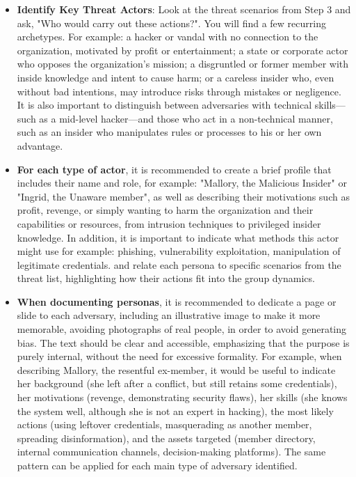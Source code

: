 \begin{itemize}
    \item \textbf{Identify Key Threat Actors}: Look at the threat scenarios from Step 3 and ask, "Who would
    carry out these actions?". You will find a few recurring archetypes. For example:
    a hacker or vandal with no connection to the organization, motivated by profit or
    entertainment; a state or corporate actor who opposes the organization's
    mission; a disgruntled or former member with inside knowledge and intent to
    cause harm; or a careless insider who, even without bad intentions, may
    introduce risks through mistakes or negligence. It is also important to
    distinguish between adversaries with technical skills—such as a mid-level
    hacker—and those who act in a non-technical manner, such as an insider who
    manipulates rules or processes to his or her own advantage.

    \item \textbf{For each type of actor}, it is recommended to create a brief profile that
    includes their name and role, for example: "Mallory, the Malicious Insider" or "Ingrid,
    the Unaware member", as well as describing their motivations such as profit,
    revenge, or simply wanting to harm the organization and their capabilities or
    resources, from intrusion techniques to privileged insider knowledge. In
    addition, it is important to indicate what methods this actor might use for example:
    phishing, vulnerability exploitation, manipulation of legitimate credentials.
    and relate each persona to specific scenarios from the threat list, highlighting
    how their actions fit into the group dynamics.

    \item \textbf{When documenting personas}, it is recommended to dedicate a page or slide to each
    adversary, including an illustrative image to make it more memorable, avoiding
    photographs of real people, in order to avoid generating bias.
    The text should be clear and accessible, emphasizing that the purpose is
    purely internal, without the need for excessive formality. For example, when
    describing Mallory, the resentful ex-member, it would be useful to indicate her
    background (she left after a conflict, but still retains some credentials), her
    motivations (revenge, demonstrating security flaws), her skills (she knows the
    system well, although she is not an expert in hacking), the most likely actions
    (using leftover credentials, masquerading as another member, spreading
    disinformation), and the assets targeted (member directory, internal
    communication channels, decision-making platforms). The same pattern can be
    applied for each main type of adversary identified.
    

\end{itemize}
